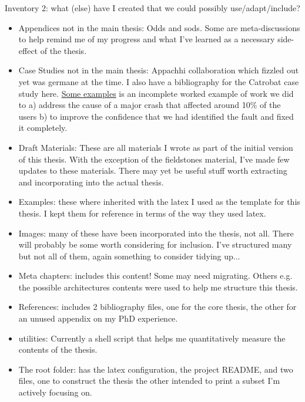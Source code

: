 Inventory 2: what (else) have I created that we could possibly use/adapt/include?
\begin{itemize}
    \item Appendices not in the main thesis: Odds and sods. Some are meta-discussions to help remind me of my progress and what I've learned as a necessary side-effect of the thesis.
    \item Case Studies not in the main thesis: Appachhi collaboration which fizzled out yet was germane at the time. I also have a bibliography for the Catrobat case study here. \href{section-some-examples}{Some examples} is an incomplete worked example of work we did to a) address the cause of a major crash that affected around 10\% of the users b) to improve the confidence that we had identified the fault and fixed it completely. 
    \item Draft Materials: These are all materials I wrote as part of the initial version of this thesis. With the exception of the fieldstones material, I've made few updates to these materials. There may yet be useful stuff worth extracting and incorporating into the actual thesis.
    \item Examples: these where inherited with the latex I used as the template for this thesis. I kept them for reference in terms of the way they used latex.
    \item Images: many of these have been incorporated into the thesis, not all. There will probably be some worth considering for inclusion. I've structured many but not all of them, again something to consider tidying up...
    \item Meta chapters: includes this content! Some may need migrating. Others e.g. the possible architectures contents were used to help me structure this thesis.
    \item References: includes 2 bibliography files, one for the core thesis, the other for an unused appendix on my PhD experience.
    \item utilities: Currently a shell script that helps me quantitatively measure the contents of the thesis.
    \item The root folder: has the latex configuration, the project README, and two files, one to construct the thesis the other intended to print a subset I'm actively focusing on.
\end{itemize}

